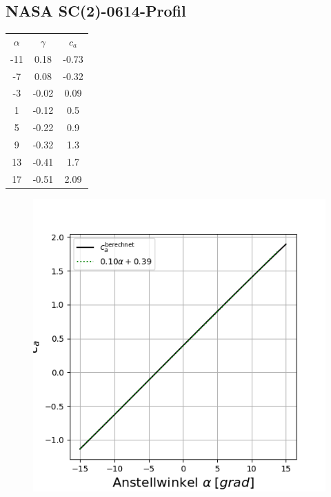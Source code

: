 \subsection{NASA SC(2)-0614-Profil}
\begin{minipage}{0.45\textwidth}
\begin{table}[H]
    \centering
    \begin{tabular}{c|cc}
    $\alpha$ & $\gamma$ & $c_a$ \\
       -11 & 0.18 & -0.73 \\ 
-7 & 0.08 & -0.32 \\ 
-3 & -0.02 & 0.09 \\ 
1 & -0.12 & 0.5 \\ 
5 & -0.22 & 0.9 \\ 
9 & -0.32 & 1.3 \\ 
13 & -0.41 & 1.7 \\ 
17 & -0.51 & 2.09 \\ 


    \end{tabular}
    \label{tab:nlf}
\end{table}
\end{minipage}
\hfill
\begin{minipage}{0.45\textwidth}
\begin{figure}[H]
    \centering
    \includegraphics[scale=0.4]{figures/sc20614ca.png}
    \label{fig:nlfca}
\end{figure}
\end{minipage}

